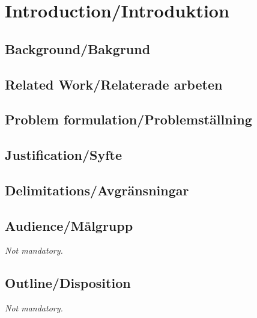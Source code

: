 \chapter{Introduction/Introduktion}\label{chapter1}

\lipsum[1]

\section{Background/Bakgrund}

\lipsum[2]

\section{Related Work/Relaterade arbeten}

\lipsum[3]

\section{Problem formulation/Problemställning}

\lipsum[4]

\section{Justification/Syfte}

\lipsum[5]

\section{Delimitations/Avgränsningar}

\lipsum[6]

\section{Audience/Målgrupp}

\emph{Not mandatory.}

\lipsum[7]

\section{Outline/Disposition}

\emph{Not mandatory.}

\lipsum[8]